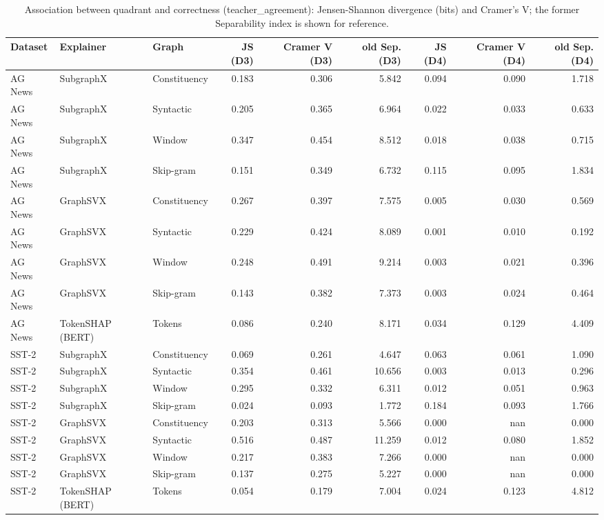\begin{table}[H]
\centering
\small
\caption{Association between quadrant and correctness (teacher_agreement): Jensen-Shannon divergence (bits) and Cramer's V; the former Separability index is shown for reference.}
\label{tab:quadrants_teacher_agreement}
\begin{tabular}{lllrrrrrr}
\toprule
Dataset & Explainer & Graph & JS (D3) & Cramer V (D3) & old Sep. (D3) & JS (D4) & Cramer V (D4) & old Sep. (D4) \\
\midrule
AG News & SubgraphX & Constituency & 0.183 & 0.306 & 5.842 & 0.094 & 0.090 & 1.718 \\
AG News & SubgraphX & Syntactic & 0.205 & 0.365 & 6.964 & 0.022 & 0.033 & 0.633 \\
AG News & SubgraphX & Window & 0.347 & 0.454 & 8.512 & 0.018 & 0.038 & 0.715 \\
AG News & SubgraphX & Skip-gram & 0.151 & 0.349 & 6.732 & 0.115 & 0.095 & 1.834 \\
AG News & GraphSVX & Constituency & 0.267 & 0.397 & 7.575 & 0.005 & 0.030 & 0.569 \\
AG News & GraphSVX & Syntactic & 0.229 & 0.424 & 8.089 & 0.001 & 0.010 & 0.192 \\
AG News & GraphSVX & Window & 0.248 & 0.491 & 9.214 & 0.003 & 0.021 & 0.396 \\
AG News & GraphSVX & Skip-gram & 0.143 & 0.382 & 7.373 & 0.003 & 0.024 & 0.464 \\
AG News & TokenSHAP (BERT) & Tokens & 0.086 & 0.240 & 8.171 & 0.034 & 0.129 & 4.409 \\
SST-2 & SubgraphX & Constituency & 0.069 & 0.261 & 4.647 & 0.063 & 0.061 & 1.090 \\
SST-2 & SubgraphX & Syntactic & 0.354 & 0.461 & 10.656 & 0.003 & 0.013 & 0.296 \\
SST-2 & SubgraphX & Window & 0.295 & 0.332 & 6.311 & 0.012 & 0.051 & 0.963 \\
SST-2 & SubgraphX & Skip-gram & 0.024 & 0.093 & 1.772 & 0.184 & 0.093 & 1.766 \\
SST-2 & GraphSVX & Constituency & 0.203 & 0.313 & 5.566 & 0.000 & nan & 0.000 \\
SST-2 & GraphSVX & Syntactic & 0.516 & 0.487 & 11.259 & 0.012 & 0.080 & 1.852 \\
SST-2 & GraphSVX & Window & 0.217 & 0.383 & 7.266 & 0.000 & nan & 0.000 \\
SST-2 & GraphSVX & Skip-gram & 0.137 & 0.275 & 5.227 & 0.000 & nan & 0.000 \\
SST-2 & TokenSHAP (BERT) & Tokens & 0.054 & 0.179 & 7.004 & 0.024 & 0.123 & 4.812 \\
\bottomrule
\end{tabular}
\end{table}

